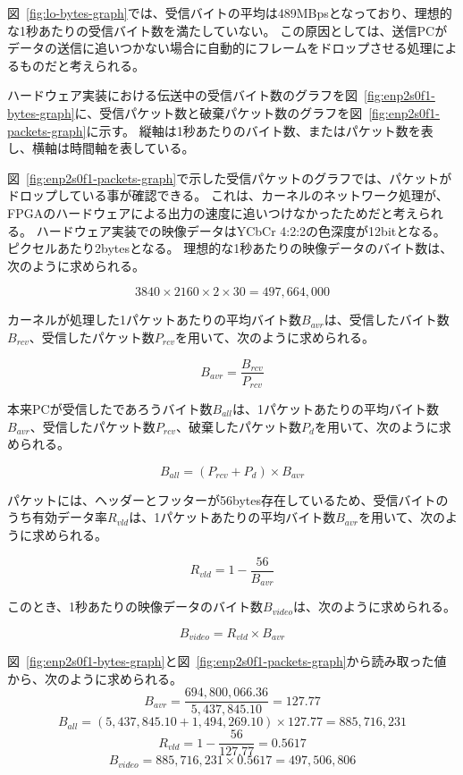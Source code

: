 図~\ref{fig:lo-bytes-graph}では、受信バイトの平均は489MBpsとなっており、理想的な1秒あたりの受信バイト数を満たしていない。
この原因としては、送信PCがデータの送信に追いつかない場合に自動的にフレームをドロップさせる処理によるものだと考えられる。



ハードウェア実装における伝送中の受信バイト数のグラフを図~\ref{fig:enp2s0f1-bytes-graph}に、受信パケット数と破棄パケット数のグラフを図~\ref{fig:enp2s0f1-packets-graph}に示す。
縦軸は1秒あたりのバイト数、またはパケット数を表し、横軸は時間軸を表している。

図~\ref{fig:enp2s0f1-packets-graph}で示した受信パケットのグラフでは、パケットがドロップしている事が確認できる。
これは、カーネルのネットワーク処理が、FPGAのハードウェアによる出力の速度に追いつけなかったためだと考えられる。
ハードウェア実装での映像データはYCbCr 4:2:2の色深度が12bitとなる。ピクセルあたり2bytesとなる。
理想的な1秒あたりの映像データのバイト数は、次のように求められる。

\[ 3840 \times 2160 \times 2 \times 30 = 497,664,000 \]

カーネルが処理した1パケットあたりの平均バイト数$B_{avr}$は、受信したバイト数$B_{rcv}$、受信したパケット数$P_{rcv}$を用いて、次のように求められる。

\[ B_{avr} = \frac{B_{rcv}}{P_{rcv}} \]

本来PCが受信したであろうバイト数$B_{all}$は、1パケットあたりの平均バイト数$B_{avr}$、受信したパケット数$P_{rcv}$、破棄したパケット数$P_d$を用いて、次のように求められる。

\[ B_{all} = (P_{rcv} + P_d) \times B_{avr} \]

パケットには、ヘッダーとフッターが56bytes存在しているため、受信バイトのうち有効データ率$R_{vld}$は、1パケットあたりの平均バイト数$B_{avr}$を用いて、次のように求められる。

\[ R_{vld} = 1 - \frac{56}{B_{avr}} \]

このとき、1秒あたりの映像データのバイト数$B_{video}$は、次のように求められる。

\[ B_{video} = R_{vld} \times B_{avr} \]

図~\ref{fig:enp2s0f1-bytes-graph}と図~\ref{fig:enp2s0f1-packets-graph}から読み取った値から、次のように求められる。
\[ B_{avr} = \frac{694,800,066.36}{5,437,845.10} = 127.77 \]
\[ B_{all} = (5,437,845.10 + 1,494,269.10) \times 127.77 = 885,716,231 \]
\[ R_{vld} = 1 - \frac{56}{127.77} = 0.5617 \]
\[ B_{video} = 885,716,231 \times 0.5617 = 497,506,806 \]

